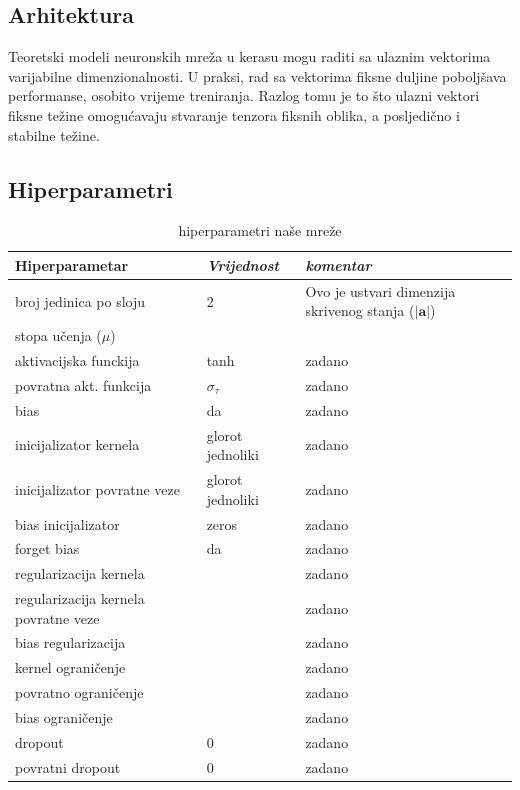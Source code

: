 \documentclass[conference]{IEEEtran}
\begin{document}
\subsection{Arhitektura}
Teoretski modeli neuronskih mreža u kerasu mogu raditi sa ulaznim vektorima varijabilne dimenzionalnosti. U praksi, rad sa vektorima fiksne duljine poboljšava performanse, osobito vrijeme treniranja. Razlog tomu je to što ulazni vektori fiksne težine omogućavaju stvaranje tenzora fiksnih oblika, a posljedično i stabilne težine.

\subsection{Hiperparametri}
\label{subsect_hiper}

\begin{table}[htbp]
\caption{hiperparametri naše mreže}
\begin{center}
\begin{tabular}{|p{120pt}|p{40pt}|p{40pt}|}
\hline
\textbf{Hiperparametar} & \textbf{\textit{Vrijednost}} & \textbf{\textit{komentar}}\\ \hline
broj jedinica po sloju & 2 & Ovo je ustvari dimenzija skrivenog stanja ($\lvert \mathbf{a} \rvert$) \\ \hline
stopa učenja ($\mu$) &  & \\ \hline \hline
aktivacijska funckija & tanh & zadano \\ \hline
povratna akt. funkcija & $\sigma_{\tau}$ & zadano \\ \hline
bias & da & zadano \\ \hline
inicijalizator kernela & glorot jednoliki & zadano \\ \hline
inicijalizator povratne veze & glorot jednoliki & zadano \\ \hline
bias inicijalizator & zeros & zadano \\ \hline
forget bias & da & zadano \\ \hline
regularizacija kernela & & zadano \\ \hline
regularizacija kernela povratne veze &  & zadano \\ \hline
bias regularizacija &  & zadano \\ \hline
kernel ograničenje &  & zadano \\ \hline
povratno ograničenje &  & zadano \\ \hline
bias ograničenje & & zadano\\ \hline
dropout & 0 & zadano \\ \hline
povratni dropout & 0 & zadano \\ \hline
\end{tabular}
\label{tab:hiper}
\end{center}
\end{table}
\end{document}
